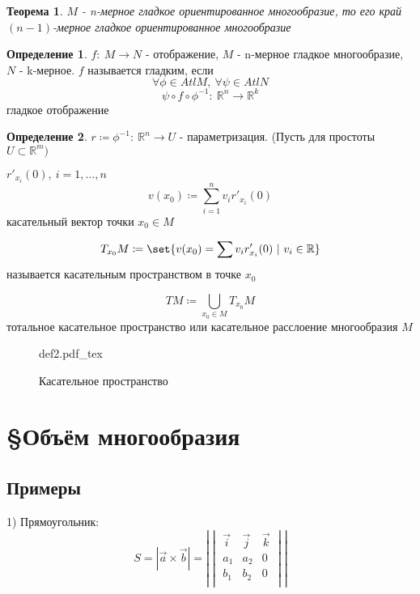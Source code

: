 \documentclass[a4paper]{article}
\DeclarePairedDelimiter\set\{\}
\newcommand{\incfig}[1]{%
\def\svgwidth{\columnwidth}
{#1.pdf_tex}
}
\newtheorem*{theorem}{Теорема}
\theoremstyle{definition}
\newtheorem*{definition}{Определение}
\theoremstyle{remark}
\begin{document}
\begin{tcolorbox}
\begin{theorem}
    $ M $ - n-мерное гладкое ориентированное многообразие, то его край
    $ (n-1) $-мерное гладкое ориентированное многообразие
\end{theorem}
\end{tcolorbox}

\begin{tcolorbox}
\begin{definition}
    $ f: \ M \to N $ - отображение, $ M $ - n-мерное гладкое многообразие,
    $ N $ - k-мерное. $ f $ называется гладким, если
    \[
        \forall \phi \in Atl M, \ \forall \psi \in Atl N
    \]
    \[
        \psi \circ f \circ \phi^{-1}: \ \mathbb{R}^n \to \mathbb{R}^k
    \]
    гладкое отображение
\end{definition}
\end{tcolorbox}

\begin{tcolorbox}
\begin{definition}
    $ r \coloneq \phi ^{-1}: \ \mathbb{R}^n \to U $ - параметризация. (Пусть
    для простоты $ U \subset \mathbb{R}^m) $ 

    $ r'_{x_i}(0), \ i = 1, \dots, n $ 
    \[
        v(x_0) \coloneq \sum_{i=1}^{n} v_i r'_{x_i}(0)
    \]
    касательный вектор точки $ x_0 \in M $ 

    \[
        T_{x_0}M \coloneq \set{v(x_0) = \sum v_i r'_{x_i}(0) \ | \ v_i \in \mathbb{R}}
    \]
    называется касательным пространством в точке $ x_0 $ 

    \[
        TM \coloneq \bigcup_{x_0 \in M} T_{x_0}M
    \]
    тотальное касательное пространство или касательное расслоение многообразия
    $ M $ 
\end{definition}
\end{tcolorbox}
\begin{figure}[ht]
    \centering
    \incfig{def2}
    \caption{Касательное пространство}
    \label{fig:def2}
\end{figure}

\section*{\centering \S Объём многообразия}

\subsection*{Примеры}
1) Прямоугольник:
\[
    S = |\vec{a} \times \vec{b}| = |
    \begin{vmatrix}
    \vec{i} & \vec{j} & \vec{k}\\
    a_1 & a_2 & 0\\
    b_1 & b_2 & 0\\
    
    \end{vmatrix}|
\]
\end{document}
